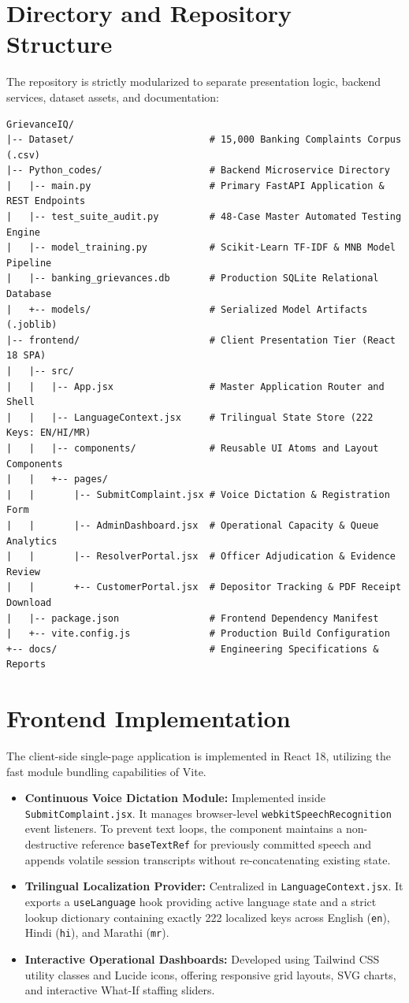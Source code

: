 \section{Directory and Repository Structure}
The repository is strictly modularized to separate presentation logic, backend services, dataset assets, and documentation:
\begin{verbatim}
GrievanceIQ/
|-- Dataset/                        # 15,000 Banking Complaints Corpus (.csv)
|-- Python_codes/                   # Backend Microservice Directory
|   |-- main.py                     # Primary FastAPI Application & REST Endpoints
|   |-- test_suite_audit.py         # 48-Case Master Automated Testing Engine
|   |-- model_training.py           # Scikit-Learn TF-IDF & MNB Model Pipeline
|   |-- banking_grievances.db       # Production SQLite Relational Database
|   +-- models/                     # Serialized Model Artifacts (.joblib)
|-- frontend/                       # Client Presentation Tier (React 18 SPA)
|   |-- src/
|   |   |-- App.jsx                 # Master Application Router and Shell
|   |   |-- LanguageContext.jsx     # Trilingual State Store (222 Keys: EN/HI/MR)
|   |   |-- components/             # Reusable UI Atoms and Layout Components
|   |   +-- pages/
|   |       |-- SubmitComplaint.jsx # Voice Dictation & Registration Form
|   |       |-- AdminDashboard.jsx  # Operational Capacity & Queue Analytics
|   |       |-- ResolverPortal.jsx  # Officer Adjudication & Evidence Review
|   |       +-- CustomerPortal.jsx  # Depositor Tracking & PDF Receipt Download
|   |-- package.json                # Frontend Dependency Manifest
|   +-- vite.config.js              # Production Build Configuration
+-- docs/                           # Engineering Specifications & Reports
\end{verbatim}

\section{Frontend Implementation}
The client-side single-page application is implemented in React 18, utilizing the fast module bundling capabilities of Vite.
\begin{itemize}
    \item \textbf{Continuous Voice Dictation Module:} Implemented inside \texttt{SubmitComplaint.jsx}. It manages browser-level \texttt{webkitSpeechRecognition} event listeners. To prevent text loops, the component maintains a non-destructive reference \texttt{baseTextRef} for previously committed speech and appends volatile session transcripts without re-concatenating existing state.
    \item \textbf{Trilingual Localization Provider:} Centralized in \texttt{LanguageContext.jsx}. It exports a \texttt{useLanguage} hook providing active language state and a strict lookup dictionary containing exactly 222 localized keys across English (\texttt{en}), Hindi (\texttt{hi}), and Marathi (\texttt{mr}).
    \item \textbf{Interactive Operational Dashboards:} Developed using Tailwind CSS utility classes and Lucide icons, offering responsive grid layouts, SVG charts, and interactive What-If staffing sliders.
\end{itemize}

